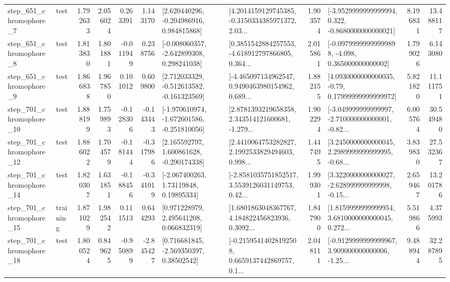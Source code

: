 \begin{tabular}{llrrrrllrlrr}
   step\_651\_chromophore\_7 &      test &      1.792633 &    2.056024 &      0.263391 &  1.143170 &    [2.620440296, -0.204986916, 0.984815868] &  [4.2014159129745385, -0.3150334385971372, 2.03... &       1.903574 &  [-3.9529999999999994, 0.322, -0.8680000000000021] &            8.196831 &         13.488117 \\
   step\_651\_chromophore\_8 &      test &      1.813830 &    1.801881 &     -0.011949 &  0.238756 &   [-0.008060357, -2.642899308, 0.298241038] &  [0.3851542884257553, -4.618912797866805, 0.364... &       2.015861 &  [-0.09799999999999898, -4.098, 0.365000000000002] &            1.799026 &          6.143080 \\
   step\_651\_chromophore\_9 &      test &      1.866838 &    1.967850 &      0.101012 &  0.609800 &   [2.712033329, -0.512613582, -0.161323569] &  [-4.465097134962547, 0.9490463980154962, 0.689... &       1.882155 &   [4.0930000000000035, -0.79, 0.17999999999999972] &            5.821820 &         11.111751 \\
  step\_701\_chromophore\_10 &      test &      1.888199 &    1.759893 &     -0.128306 & -0.143443 &  [-1.970610974, -1.672601586, -0.251810056] &  [2.8781393219658358, 2.343514121600681, -1.279... &       1.902294 &  [-3.049999999999997, -2.710000000000001, -0.82... &            6.005764 &         30.549480 \\
  step\_701\_chromophore\_12 &      test &      1.886022 &    1.704579 &     -0.181444 & -0.317986 &    [2.165592797, 1.600861628, -0.290174338] &  [2.4410064753282827, 2.1992533829494603, 0.998... &       1.447495 &  [3.2450000000000045, 2.2989999999999995, -0.68... &            3.839830 &         27.532367 \\
  step\_701\_chromophore\_14 &      test &      1.820307 &    1.631851 &     -0.188456 & -0.341019 &      [-2.067400263, 1.73119848, 0.19895334] &  [-2.8581035751852517, 3.5539126031149753, 0.42... &       1.999301 &  [3.3220000000000027, -2.628999999999998, -0.15... &            2.659467 &         13.201786 \\
  step\_701\_chromophore\_15 &  training &      1.871029 &    1.982542 &      0.111513 &  0.644293 &     [0.971228979, 2.495641208, 0.066832319] &  [1.6801863048367767, 4.184822456823936, 0.3092... &       1.847900 &  [1.8159999999999954, 3.6810000000000045, 0.272... &            5.519866 &          4.375993 \\
  step\_701\_chromophore\_18 &      test &      1.800524 &    0.849625 &     -0.950899 & -2.845427 &     [0.716681845, -2.569350397, 0.38502542] &  [-0.21595414028192508, 0.6659137442869757, 0.1... &       2.048111 &  [-0.9129999999999967, 3.909000000000006, -1.25... &            9.488944 &         32.287895 \\

\end{tabular}
